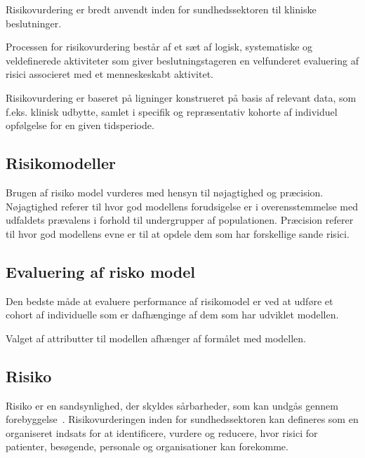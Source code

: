 Risikovurdering er bredt anvendt inden for sundhedssektoren til kliniske beslutninger\citep{flere}. %


Processen for risikovurdering består af et sæt af logisk, systematiske og veldefinerede aktiviteter som giver beslutningstageren en velfunderet evaluering af risici associeret med et menneskeskabt aktivitet. \citep{bog}

Risikovurdering er baseret på ligninger konstrueret på basis af relevant data, som f.eks. klinisk udbytte, samlet i specifik og repræsentativ kohorte af individuel opfølgelse for en given tidsperiode. \citep{bog}

\subsection{Risikomodeller}
Brugen af risiko model vurderes med hensyn til nøjagtighed og præcision. Nøjagtighed referer til hvor god modellens forudsigelse er i overensstemmelse med udfaldets prævalens i forhold til undergrupper af populationen. Præcision referer til hvor god modellens evne er til at opdele dem som har forskellige sande risici. \citep{Davison2008}
 
\subsection{Evaluering af risko model}
Den bedste måde at evaluere performance af risikomodel er ved at udføre et cohort af individuelle som er dafhænginge af dem som har udviklet modellen.\citep{Davison2008}

Valget af attributter til modellen afhænger af formålet med modellen. \citep{Davison2008}

\subsection{Risiko}
Risiko er en sandsynlighed, der skyldes sårbarheder, som kan undgås gennem forebyggelse~\citep{Alam2016}. %
Risikovurderingen inden for sundhedssektoren kan defineres som en organiseret indsats for at identificere, vurdere og reducere, hvor risici for patienter, besøgende, personale og organisationer kan forekomme. ~\citep{Alam2016}


